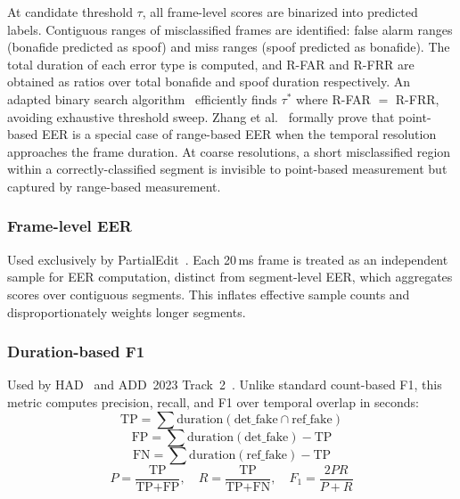 \documentclass[journal]{IEEEtran}
\begin{document}
At candidate threshold $\tau$, all frame-level scores are binarized into predicted labels. Contiguous ranges of misclassified frames are identified: false alarm ranges (bonafide predicted as spoof) and miss ranges (spoof predicted as bonafide). The total duration of each error type is computed, and R-FAR and R-FRR are obtained as ratios over total bonafide and spoof duration respectively. An adapted binary search algorithm~\cite{zhang2023rangeeer} efficiently finds $\tau^*$ where R-FAR $=$ R-FRR, avoiding exhaustive threshold sweep. Zhang et al.~\cite{zhang2023rangeeer} formally prove that point-based EER is a special case of range-based EER when the temporal resolution approaches the frame duration. At coarse resolutions, a short misclassified region within a correctly-classified segment is invisible to point-based measurement but captured by range-based measurement.

\subsubsection{Frame-level EER}

Used exclusively by PartialEdit~\cite{zhang2025partialedit}. Each 20\,ms frame is treated as an independent sample for EER computation, distinct from segment-level EER, which aggregates scores over contiguous segments. This inflates effective sample counts and disproportionately weights longer segments.

\subsubsection{Duration-based F1}

Used by HAD~\cite{yi2021had} and ADD~2023 Track~2~\cite{yi2023add}. Unlike standard count-based F1, this metric computes precision, recall, and F1 over temporal overlap in seconds:
\begin{equation}
\label{eq:dur_tp}
\text{TP} = \sum \text{duration}(\text{det\_fake} \cap \text{ref\_fake})
\end{equation}
\begin{equation}
\label{eq:dur_fp}
\text{FP} = \sum \text{duration}(\text{det\_fake}) - \text{TP}
\end{equation}
\begin{equation}
\label{eq:dur_fn}
\text{FN} = \sum \text{duration}(\text{ref\_fake}) - \text{TP}
\end{equation}
\begin{equation}
\label{eq:dur_f1}
P = \frac{\text{TP}}{\text{TP} + \text{FP}}, \quad R = \frac{\text{TP}}{\text{TP} + \text{FN}}, \quad F_1 = \frac{2PR}{P + R}
\end{equation}
\end{document}

